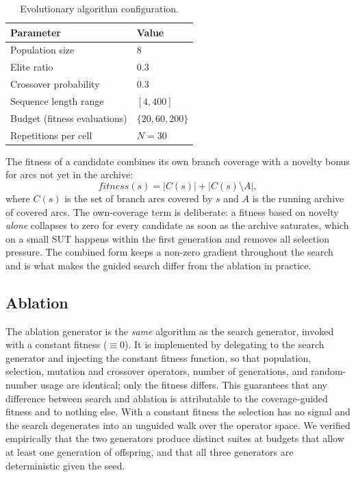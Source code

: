 \documentclass[conference]{IEEEtran}
\begin{document}
\begin{table}[t]
\centering
\caption{Evolutionary algorithm configuration.}
\label{tab:params}
\begin{tabular}{ll}
\toprule
Parameter & Value \\
\midrule
Population size & 8 \\
Elite ratio & 0.3 \\
Crossover probability & 0.3 \\
Sequence length range & $[4, 400]$ \\
Budget (fitness evaluations) & $\{20, 60, 200\}$ \\
Repetitions per cell & $N=30$ \\
\bottomrule
\end{tabular}
\end{table}

The fitness of a candidate combines its own branch coverage with a novelty
bonus for arcs not yet in the archive:
\[
\mathit{fitness}(s) = |C(s)| + |C(s)\setminus A|,
\]
where $C(s)$ is the set of branch arcs covered by $s$ and $A$ is the running
archive of covered arcs. The own-coverage term is deliberate: a fitness based on
novelty \emph{alone} collapses to zero for every candidate as soon as the
archive saturates, which on a small SUT happens within the first generation and
removes all selection pressure. The combined form keeps a non-zero gradient
throughout the search and is what makes the guided search differ from the
ablation in practice.

\subsection{Ablation}
The ablation generator is the \emph{same} algorithm as the search generator,
invoked with a constant fitness ($\equiv 0$). It is implemented by delegating to
the search generator and injecting the constant fitness function, so that
population, selection, mutation and crossover operators, number of generations,
and random-number usage are identical; only the fitness differs. This guarantees
that any difference between search and ablation is attributable to the
coverage-guided fitness and to nothing else. With a constant fitness the
selection has no signal and the search degenerates into an unguided walk over the
operator space. We verified empirically that the two generators produce distinct
suites at budgets that allow at least one generation of offspring, and that all
three generators are deterministic given the seed.
\end{document}
